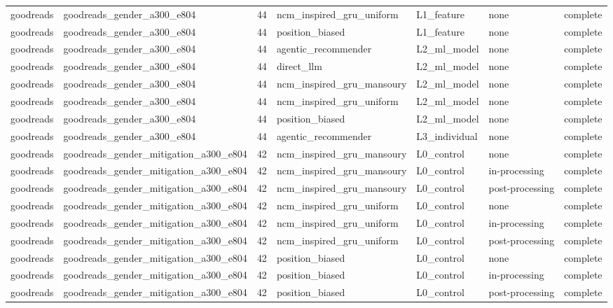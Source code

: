 \begin{table}[htbp!]
\begin{tabular}{llrllll}
goodreads & goodreads\_gender\_a300\_e804 & 44 & ncm\_inspired\_gru\_uniform & L1\_feature & none & complete \\
goodreads & goodreads\_gender\_a300\_e804 & 44 & position\_biased & L1\_feature & none & complete \\
goodreads & goodreads\_gender\_a300\_e804 & 44 & agentic\_recommender & L2\_ml\_model & none & complete \\
goodreads & goodreads\_gender\_a300\_e804 & 44 & direct\_llm & L2\_ml\_model & none & complete \\
goodreads & goodreads\_gender\_a300\_e804 & 44 & ncm\_inspired\_gru\_mansoury & L2\_ml\_model & none & complete \\
goodreads & goodreads\_gender\_a300\_e804 & 44 & ncm\_inspired\_gru\_uniform & L2\_ml\_model & none & complete \\
goodreads & goodreads\_gender\_a300\_e804 & 44 & position\_biased & L2\_ml\_model & none & complete \\
goodreads & goodreads\_gender\_a300\_e804 & 44 & agentic\_recommender & L3\_individual & none & complete \\
goodreads & goodreads\_gender\_mitigation\_a300\_e804 & 42 & ncm\_inspired\_gru\_mansoury & L0\_control & none & complete \\
goodreads & goodreads\_gender\_mitigation\_a300\_e804 & 42 & ncm\_inspired\_gru\_mansoury & L0\_control & in-processing & complete \\
goodreads & goodreads\_gender\_mitigation\_a300\_e804 & 42 & ncm\_inspired\_gru\_mansoury & L0\_control & post-processing & complete \\
goodreads & goodreads\_gender\_mitigation\_a300\_e804 & 42 & ncm\_inspired\_gru\_uniform & L0\_control & none & complete \\
goodreads & goodreads\_gender\_mitigation\_a300\_e804 & 42 & ncm\_inspired\_gru\_uniform & L0\_control & in-processing & complete \\
goodreads & goodreads\_gender\_mitigation\_a300\_e804 & 42 & ncm\_inspired\_gru\_uniform & L0\_control & post-processing & complete \\
goodreads & goodreads\_gender\_mitigation\_a300\_e804 & 42 & position\_biased & L0\_control & none & complete \\
goodreads & goodreads\_gender\_mitigation\_a300\_e804 & 42 & position\_biased & L0\_control & in-processing & complete \\
goodreads & goodreads\_gender\_mitigation\_a300\_e804 & 42 & position\_biased & L0\_control & post-processing & complete \\

\end{tabular}
\end{table}
